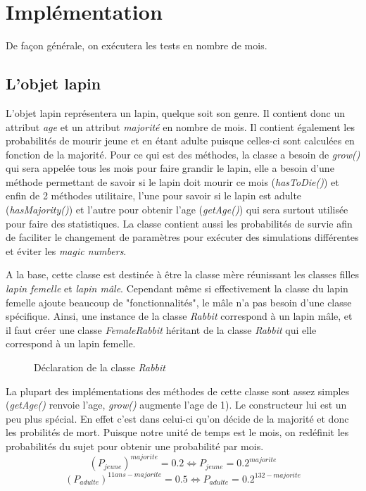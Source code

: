 \documentclass{article}
\begin{document}
\section{Implémentation}
De façon générale, on exécutera les tests en nombre de mois.

\subsection{L'objet lapin}
L'objet lapin représentera un lapin, quelque soit son genre. Il contient
donc un attribut \emph{age} et un attribut \emph{majorité} en nombre de mois.
Il contient également les probabilités de mourir jeune et en étant adulte
puisque celles-ci sont calculées en fonction de la majorité. Pour ce qui
est des méthodes, la classe a besoin de \emph{grow()} qui sera appelée tous les
mois pour faire grandir le lapin, elle a besoin d'une méthode permettant
de savoir si le lapin doit mourir ce mois (\emph{hasToDie()}) et enfin
de 2 méthodes utilitaire, l'une pour savoir si le lapin est adulte
(\emph{hasMajority()}) et l'autre pour obtenir l'age (\emph{getAge()}) qui
sera surtout utilisée pour faire des statistiques. La classe contient aussi
les probabilités de survie afin de faciliter le changement de paramètres
pour exécuter des simulations différentes et éviter les \emph{magic numbers}.

A la base, cette classe est destinée à être la classe mère réunissant les
classes filles \emph{lapin femelle} et \emph{lapin mâle}. Cependant même si
effectivement la classe du lapin femelle ajoute beaucoup de "fonctionnalités",
le mâle n'a pas besoin d'une classe spécifique. Ainsi, une instance de la
classe \emph{Rabbit} correspond à un lapin mâle, et il faut créer une classe
\emph{FemaleRabbit} héritant de la classe \emph{Rabbit} qui elle correspond
à un lapin femelle.

\begin{figure}[!h]
  \centering
  \caption{Déclaration de la classe \emph{Rabbit}}
  
\end{figure}

\newpage

La plupart des implémentations des méthodes de cette classe sont assez simples
(\emph{getAge()} renvoie l'age, \emph{grow()} augmente l'age de 1). Le constructeur
lui est un peu plus spécial. En effet c'est dans celui-ci qu'on décide de
la majorité et donc les probilités de mort. Puisque notre unité de temps
est le mois, on redéfinit les probabilités du sujet pour obtenir une probabilité
par mois.
$$
(P_{jeune})^{majorite} = 0.2 \Leftrightarrow P_{jeune} = 0.2^{majorite}
$$
$$
(P_{adulte})^{11 ans - majorite} = 0.5 \Leftrightarrow P_{adulte} = 0.2^{132 - majorite}
$$
\end{document}
